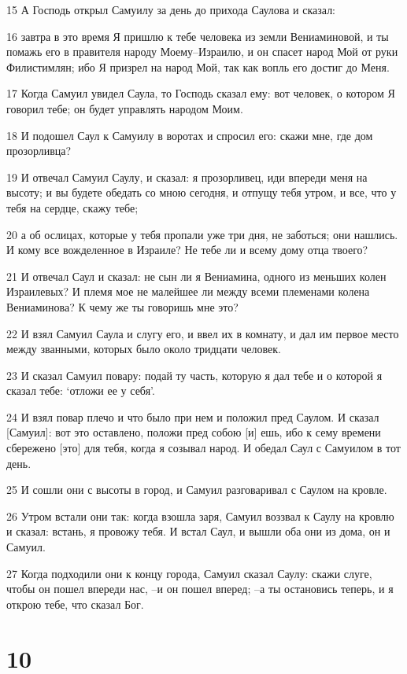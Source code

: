 \par 15 А Господь открыл Самуилу за день до прихода Саулова и сказал:
\par 16 завтра в это время Я пришлю к тебе человека из земли Вениаминовой, и ты помажь его в правителя народу Моему--Израилю, и он спасет народ Мой от руки Филистимлян; ибо Я призрел на народ Мой, так как вопль его достиг до Меня.
\par 17 Когда Самуил увидел Саула, то Господь сказал ему: вот человек, о котором Я говорил тебе; он будет управлять народом Моим.
\par 18 И подошел Саул к Самуилу в воротах и спросил его: скажи мне, где дом прозорливца?
\par 19 И отвечал Самуил Саулу, и сказал: я прозорливец, иди впереди меня на высоту; и вы будете обедать со мною сегодня, и отпущу тебя утром, и все, что у тебя на сердце, скажу тебе;
\par 20 а об ослицах, которые у тебя пропали уже три дня, не заботься; они нашлись. И кому все вожделенное в Израиле? Не тебе ли и всему дому отца твоего?
\par 21 И отвечал Саул и сказал: не сын ли я Вениамина, одного из меньших колен Израилевых? И племя мое не малейшее ли между всеми племенами колена Вениаминова? К чему же ты говоришь мне это?
\par 22 И взял Самуил Саула и слугу его, и ввел их в комнату, и дал им первое место между званными, которых было около тридцати человек.
\par 23 И сказал Самуил повару: подай ту часть, которую я дал тебе и о которой я сказал тебе: `отложи ее у себя'.
\par 24 И взял повар плечо и что было при нем и положил пред Саулом. И сказал [Самуил]: вот это оставлено, положи пред собою [и] ешь, ибо к сему времени сбережено [это] для тебя, когда я созывал народ. И обедал Саул с Самуилом в тот день.
\par 25 И сошли они с высоты в город, и Самуил разговаривал с Саулом на кровле.
\par 26 Утром встали они так: когда взошла заря, Самуил воззвал к Саулу на кровлю и сказал: встань, я провожу тебя. И встал Саул, и вышли оба они из дома, он и Самуил.
\par 27 Когда подходили они к концу города, Самуил сказал Саулу: скажи слуге, чтобы он пошел впереди нас, --и он пошел вперед; --а ты остановись теперь, и я открою тебе, что сказал Бог.

\chapter{10}

